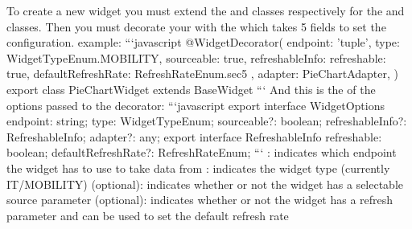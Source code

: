 \markdownRendererInterblockSeparator
{}\markdownRendererInterblockSeparator
{}To create a new widget you must extend the  and  classes respectively for the  and  classes.\markdownRendererInterblockSeparator
{}Then you must decorate your  with the  which takes 5 fields to set the configuration.\markdownRendererInterblockSeparator
{} example: ```javascript @WidgetDecorator(\markdownRendererLeftBrace{} endpoint: 'tuple', type: WidgetTypeEnum.MOBILITY, sourceable: true, refreshableInfo: \markdownRendererLeftBrace{} refreshable: true, defaultRefreshRate: RefreshRateEnum.sec\markdownRendererUnderscore{}5 \markdownRendererRightBrace{}, adapter: PieChartAdapter, \markdownRendererRightBrace{}) export class PieChartWidget extends BaseWidget \markdownRendererLeftBrace{}\markdownRendererInterblockSeparator
{}\markdownRendererEllipsis{}\markdownRendererInterblockSeparator
{}\markdownRendererRightBrace{} ```\markdownRendererInterblockSeparator
{}And this is the  of the options passed to the decorator:\markdownRendererInterblockSeparator
{}```javascript export interface WidgetOptions \markdownRendererLeftBrace{} endpoint: string; type: WidgetTypeEnum; sourceable?: boolean; refreshableInfo?: RefreshableInfo; adapter?: any; \markdownRendererRightBrace{}\markdownRendererInterblockSeparator
{}export interface RefreshableInfo \markdownRendererLeftBrace{} refreshable: boolean; defaultRefreshRate?: RefreshRateEnum; \markdownRendererRightBrace{} ```\markdownRendererInterblockSeparator
{}\markdownRendererUlBeginTight
\markdownRendererUlItem {}: indicates which endpoint the widget has to use to take data from \markdownRendererUlItemEnd 
\markdownRendererUlItem {}: indicates the widget type (currently IT/MOBILITY)\markdownRendererUlItemEnd 
\markdownRendererUlItem {} (optional): indicates whether or not the widget has a selectable source parameter\markdownRendererUlItemEnd 
\markdownRendererUlItem {} (optional): indicates whether or not the widget has a refresh parameter and can be used to set the default refresh rate\markdownRendererUlItemEnd 
